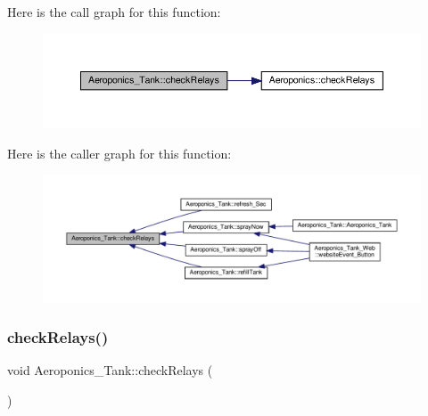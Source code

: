 Here is the call graph for this function\+:
\nopagebreak
\begin{figure}[H]
\begin{center}
\leavevmode
\includegraphics[width=350pt]{class_aeroponics___tank_a4ee215af07d5ee08e2b12efc9a7e1db9_cgraph}
\end{center}
\end{figure}
Here is the caller graph for this function\+:
\nopagebreak
\begin{figure}[H]
\begin{center}
\leavevmode
\includegraphics[width=350pt]{class_aeroponics___tank_a4ee215af07d5ee08e2b12efc9a7e1db9_icgraph}
\end{center}
\end{figure}
\mbox{\label{class_aeroponics___tank_a4ee215af07d5ee08e2b12efc9a7e1db9}} 
\subsubsection{\texorpdfstring{check\+Relays()}{checkRelays()}\hspace{0.1cm}{\footnotesize\ttfamily [2/2]}}
{\footnotesize\ttfamily void Aeroponics\+\_\+\+Tank\+::check\+Relays (\begin{DoxyParamCaption}{ }\end{DoxyParamCaption})\hspace{0.3cm}{\ttfamily [protected]}}

\mbox{\label{class_aeroponics___tank_a95906ab4c83355062f26e898edbc2337}} 
